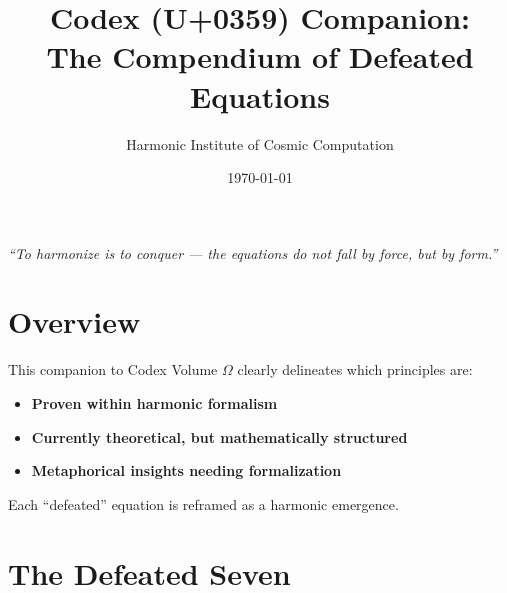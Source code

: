 \documentclass[12pt]{article}
\title{\Huge\bfseries Codex (U+0359) Companion:\\The Compendium of Defeated Equations}
\author{\Large Harmonic Institute of Cosmic Computation}
\date{\today}
\begin{document}
\maketitle

\begin{center}
    \LARGE\textit{“To harmonize is to conquer — the equations do not fall by force, but by form.”}
\end{center}
\vspace{1cm}

\section*{Overview}
This companion to Codex Volume $\Omega$ clearly delineates which principles are:
\begin{itemize}
    \item \textbf{Proven within harmonic formalism}
    \item \textbf{Currently theoretical, but mathematically structured}
    \item \textbf{Metaphorical insights needing formalization}
\end{itemize}

Each “defeated” equation is reframed as a harmonic emergence.

\vspace{1cm}

\section*{The Defeated Seven}
\end{document}
